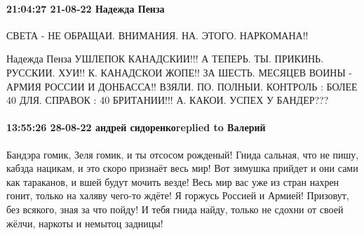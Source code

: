 \paragraph{21:04:27 21-08-22 Надежда Пенза}

СВЕТА - НЕ ОБРАЩАИ. ВНИМАНИЯ. НА. ЭТОГО. НАРКОМАНА!!

Надежда Пенза
УШЛЕПОК КАНАДСКИИ!!!
А ТЕПЕРЬ. ТЫ. ПРИКИНЬ. РУССКИИ. ХУИ!!
К. КАНАДСКОИ ЖОПЕ!!
ЗА ШЕСТЬ. МЕСЯЦЕВ ВОИНЫ -
АРМИЯ РОССИИ И ДОНБАССА!!
ВЗЯЛИ. ПО. ПОЛНЫИ. КОНТРОЛЬ :
БОЛЕЕ 40 %
ДЛЯ. СПРАВОК :
40 %
БРИТАНИИ!!!
А. КАКОИ. УСПЕХ У БАНДЕР???

\paragraph{13:55:26 28-08-22 андрей сидоренкоreplied to Валерий}

Бандэра гомик, Зеля гомик, и ты отсосом рожденый! Гнида сальная, что не пишу,
кабзда нацикам, и это скоро признаёт весь мир! Вот зимушка прийдет и они сами
как тараканов, и вшей будут мочить везде! Весь мир вас уже из стран нахрен
гонит, только на халяву чего-то ждёте! Я горжусь Россией и Армией! Призовут,
без всякого, зная за что пойду! И тебя гнида найду, только не сдохни от своей
жёлчи, наркоты и немытоц задницы!

